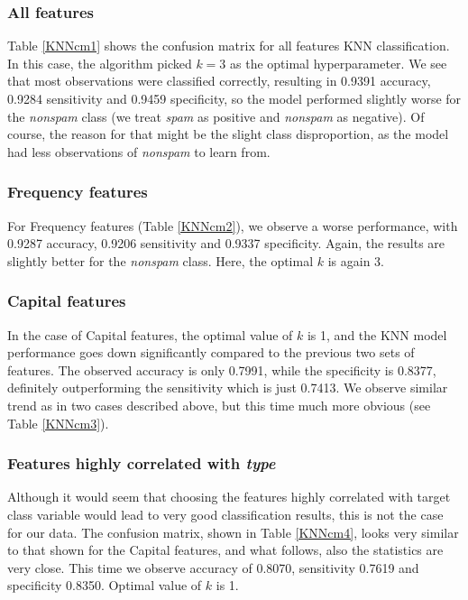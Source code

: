 \documentclass{article}\usepackage[]{graphicx}\usepackage[]{xcolor}
\begin{document}
\subsubsection*{All features}

Table \ref{KNNcm1} shows the confusion matrix for all features KNN classification.
In this case, the algorithm picked $k=3$ as the optimal hyperparameter.
We see that most observations were classified correctly, resulting in 0.9391 accuracy,
0.9284 sensitivity and 0.9459 specificity, so the model performed slightly worse for 
the \textit{nonspam} class (we treat \textit{spam} as positive and \textit{nonspam} as negative).
Of course, the reason for that might be the slight class disproportion, as the model
had less observations of \textit{nonspam} to learn from.

\subsubsection*{Frequency features}

For Frequency features (Table \ref{KNNcm2}), we observe a worse performance, with 0.9287 accuracy,
0.9206 sensitivity and 0.9337 specificity. Again, the results are slightly better 
for the \textit{nonspam} class. Here, the optimal $k$ is again 3.

\subsubsection*{Capital features}

In the case of Capital features, the optimal value of $k$ is 1, and the KNN model performance goes down significantly
compared to the previous two sets of features. The observed accuracy is only 0.7991,
while the specificity is 0.8377, definitely outperforming the sensitivity
which is just 0.7413. We observe similar trend as in two cases described above, but 
this time much more obvious (see Table \ref{KNNcm3}).

\subsubsection*{Features highly correlated with \textit{type}}

Although it would seem that choosing the features highly correlated with target class variable
would lead to very good classification results, this is not the case for our data.
The confusion matrix, shown in Table \ref{KNNcm4}, looks very similar to that shown for the Capital features, 
and what follows, also the statistics are very close. This time we observe accuracy of
0.8070, sensitivity 0.7619 and specificity 0.8350. Optimal value of $k$ is 1.
\end{document}
